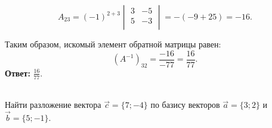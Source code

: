 \documentclass[10pt]{article}
\numberwithin{primer}{section}
\numberwithin{equation}{section}
\begin{document}
\begin{equation*}
A_{23}=(-1)^{2+3}\begin{vmatrix}
3 & -5\\
5 & -3\\
\end{vmatrix}=-(-9+25)=-16.
\end{equation*}

Таким образом, искомый элемент обратной матрицы равен: \[\left(A^{-1}\right)_{32}=\frac{-16}{-77}=\frac{16}{77}.\]
\noindent\textbf{Ответ: }$\frac{16}{77}$.\vspace{4pt}

\noindent\hrulefill\,\,\hrulefill\vspace{4pt}\\
Найти разложение вектора $\vec{c}=\{7;-4\}$ по базису векторов $\vec{a}=\{3;2\}$ и $\vec{b}=\{5;-1\}$.\vspace{4pt}

\noindent{}\,\hrulefill\vspace{4pt}
\end{document}
